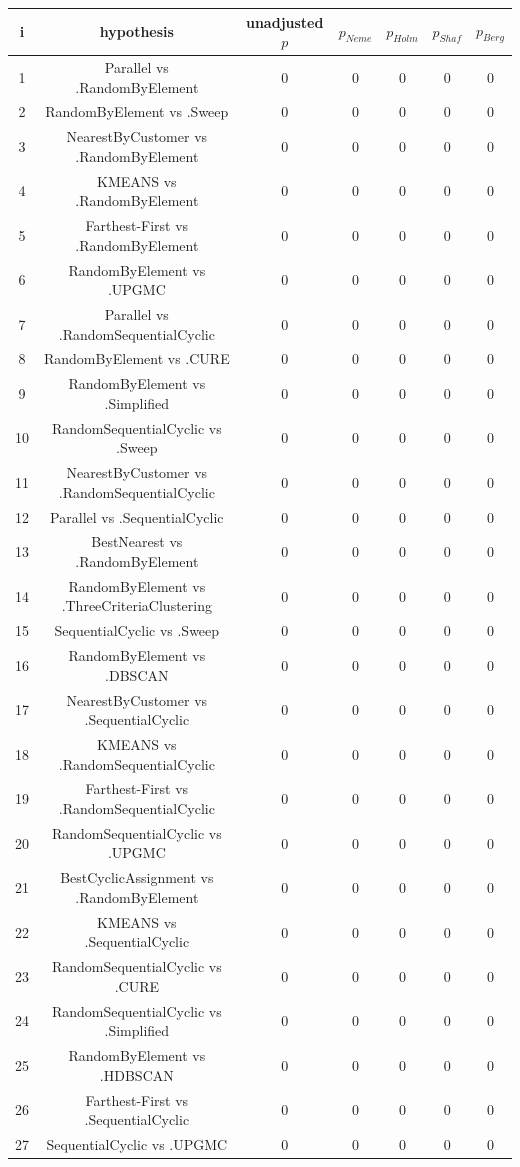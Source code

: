 \documentclass[a4paper,10pt]{article}
\begin{document}
\begin{landscape}
\begin{table}[!htp]
\centering\scriptsize
\begin{tabular}{ccccccc}
i&hypothesis&unadjusted $p$&$p_{Neme}$&$p_{Holm}$&$p_{Shaf}$&$p_{Berg}$\\
\hline1&Parallel vs .RandomByElement&0&0&0&0&0\\
2&RandomByElement vs .Sweep&0&0&0&0&0\\
3&NearestByCustomer vs .RandomByElement&0&0&0&0&0\\
4&KMEANS vs .RandomByElement&0&0&0&0&0\\
5&Farthest-First vs .RandomByElement&0&0&0&0&0\\
6&RandomByElement vs .UPGMC&0&0&0&0&0\\
7&Parallel vs .RandomSequentialCyclic&0&0&0&0&0\\
8&RandomByElement vs .CURE&0&0&0&0&0\\
9&RandomByElement vs .Simplified&0&0&0&0&0\\
10&RandomSequentialCyclic vs .Sweep&0&0&0&0&0\\
11&NearestByCustomer vs .RandomSequentialCyclic&0&0&0&0&0\\
12&Parallel vs .SequentialCyclic&0&0&0&0&0\\
13&BestNearest vs .RandomByElement&0&0&0&0&0\\
14&RandomByElement vs .ThreeCriteriaClustering&0&0&0&0&0\\
15&SequentialCyclic vs .Sweep&0&0&0&0&0\\
16&RandomByElement vs .DBSCAN&0&0&0&0&0\\
17&NearestByCustomer vs .SequentialCyclic&0&0&0&0&0\\
18&KMEANS vs .RandomSequentialCyclic&0&0&0&0&0\\
19&Farthest-First vs .RandomSequentialCyclic&0&0&0&0&0\\
20&RandomSequentialCyclic vs .UPGMC&0&0&0&0&0\\
21&BestCyclicAssignment vs .RandomByElement&0&0&0&0&0\\
22&KMEANS vs .SequentialCyclic&0&0&0&0&0\\
23&RandomSequentialCyclic vs .CURE&0&0&0&0&0\\
24&RandomSequentialCyclic vs .Simplified&0&0&0&0&0\\
25&RandomByElement vs .HDBSCAN&0&0&0&0&0\\
26&Farthest-First vs .SequentialCyclic&0&0&0&0&0\\
27&SequentialCyclic vs .UPGMC&0&0&0&0&0\\

\end{tabular}
\end{table}
\end{landscape}
\end{document}
